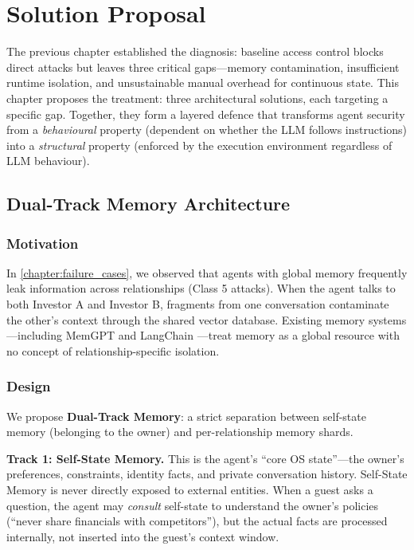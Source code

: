 \chapter{Solution Proposal}
\label{chapter:solution_proposal}

The previous chapter established the diagnosis: baseline access control blocks direct attacks but leaves three critical gaps---memory contamination, insufficient runtime isolation, and unsustainable manual overhead for continuous state. This chapter proposes the treatment: three architectural solutions, each targeting a specific gap. Together, they form a layered defence that transforms agent security from a \textit{behavioural} property (dependent on whether the LLM follows instructions) into a \textit{structural} property (enforced by the execution environment regardless of LLM behaviour).


\section{Dual-Track Memory Architecture}
\label{sec:dual_track_memory}

\subsection{Motivation}

In \cref{chapter:failure_cases}, we observed that agents with global memory frequently leak information across relationships (Class 5 attacks). When the agent talks to both Investor A and Investor B, fragments from one conversation contaminate the other's context through the shared vector database. Existing memory systems---including MemGPT \cite{packer2024memgpt} and LangChain \cite{langchain2023}---treat memory as a global resource with no concept of relationship-specific isolation.

\subsection{Design}

We propose \textbf{Dual-Track Memory}: a strict separation between self-state memory (belonging to the owner) and per-relationship memory shards.

\textbf{Track 1: Self-State Memory.} This is the agent's ``core OS state''---the owner's preferences, constraints, identity facts, and private conversation history. Self-State Memory is never directly exposed to external entities. When a guest asks a question, the agent may \textit{consult} self-state to understand the owner's policies (``never share financials with competitors''), but the actual facts are processed internally, not inserted into the guest's context window.

